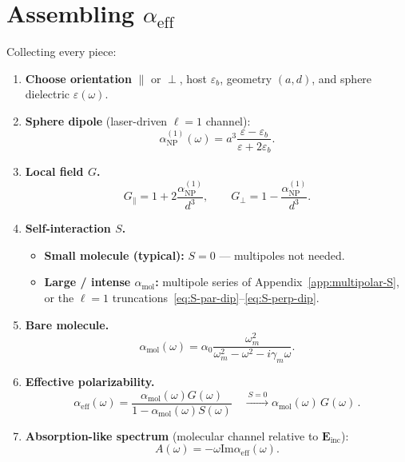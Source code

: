 \documentclass[11pt,a4paper]{article}
\theoremstyle{definition}
\newcommand{\epsb}{\varepsilon_b}
\newcommand{\epsm}{\varepsilon}
\newcommand{\alpham}{\alpha_{\text{mol}}}
\newcommand{\alphanp}{\alpha_{\text{NP}}}
\newcommand{\alphaeff}{\alpha_{\mathrm{eff}}}
\newcommand{\Einc}{\mathbf{E}_{\mathrm{inc}}}
\begin{document}
\section{Assembling $\alpha_{\mathrm{eff}}$}

\noindent
Collecting every piece:

\begin{enumerate}[leftmargin=1.8em]
  \item \textbf{Choose orientation} $\parallel$ or $\perp$, host $\epsb$, geometry $(a,d)$, and sphere dielectric $\epsm(\omega)$.

  \item \textbf{Sphere dipole} (laser-driven $\ell=1$ channel):
  \[
    \alphanp^{(1)}(\omega)
    =
    a^{3}
    \frac{\epsm-\epsb}{\epsm+2\epsb} .
  \]

  \item \textbf{Local field $G$.}
  \[
    G_\parallel = 1 + 2\frac{\alphanp^{(1)}}{d^3} ,
    \qquad
    G_\perp = 1 - \frac{\alphanp^{(1)}}{d^3} .
  \]

  \item \textbf{Self-interaction $S$.}
  \begin{itemize}[leftmargin=1.4em]
    \item \textbf{Small molecule (typical):} $S=0$ --- multipoles not needed.
    \item \textbf{Large / intense $\alpham$:} multipole series of Appendix~\ref{app:multipolar-S}, or the $\ell=1$ truncations~\eqref{eq:S-par-dip}--\eqref{eq:S-perp-dip}.
  \end{itemize}

  \item \textbf{Bare molecule.}
  \[
    \alpham(\omega)
    =
    \alpha_0
    \frac{\omega_m^2}{\omega_m^2-\omega^2-i\gamma_m\omega} .
  \]

  \item \textbf{Effective polarizability.}
  \[
    \boxed{
      \alphaeff(\omega)
      =
      \frac{\alpham(\omega) G(\omega)}{1-\alpham(\omega) S(\omega)}
      \quad
      \xrightarrow{\,S=0\,}
      \alpham(\omega)\, G(\omega)\,.
    }
  \]

  \item \textbf{Absorption-like spectrum} (molecular channel relative to $\Einc$):
  \[
    A(\omega) = -\omega \mathrm{Im} \alphaeff(\omega) .
  \]
\end{enumerate}
\end{document}
